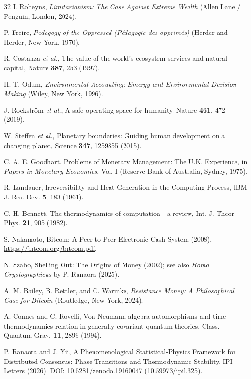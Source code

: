 \documentclass[aps,pre,twocolumn,10pt,superscriptaddress,amsmath,amssymb,amsfonts,floatfix,showkeys]{revtex4-2}
\begin{document}
\begin{thebibliography}{32}
I. Robeyns, \textit{Limitarianism: The Case Against Extreme Wealth} (Allen Lane / Penguin, London, 2024).

P. Freire, \textit{Pedagogy of the Oppressed (P\'edagogie des opprim\'es)} (Herder and Herder, New York, 1970).

R. Costanza \textit{et al.}, The value of the world's ecosystem services and natural capital, Nature \textbf{387}, 253 (1997).

H. T. Odum, \textit{Environmental Accounting: Emergy and Environmental Decision Making} (Wiley, New York, 1996).

J. Rockstr\"om \textit{et al.}, A safe operating space for humanity, Nature \textbf{461}, 472 (2009).

W. Steffen \textit{et al.}, Planetary boundaries: Guiding human development on a changing planet, Science \textbf{347}, 1259855 (2015).

C. A. E. Goodhart, Problems of Monetary Management: The U.K. Experience, in \textit{Papers in Monetary Economics}, Vol. I (Reserve Bank of Australia, Sydney, 1975).

R. Landauer, Irreversibility and Heat Generation in the Computing Process, IBM J. Res. Dev. \textbf{5}, 183 (1961).

C. H. Bennett, The thermodynamics of computation---a review, Int. J. Theor. Phys. \textbf{21}, 905 (1982).

S. Nakamoto, Bitcoin: A Peer-to-Peer Electronic Cash System (2008), \url{https://bitcoin.org/bitcoin.pdf}.

N. Szabo, Shelling Out: The Origins of Money (2002); see also \textit{Homo Cryptographicus} by P. Ranaora (2025).

A. M. Bailey, B. Rettler, and C. Warmke, \textit{Resistance Money: A Philosophical Case for Bitcoin} (Routledge, New York, 2024).

A. Connes and C. Rovelli, Von Neumann algebra automorphisms and time-thermodynamics relation in generally covariant quantum theories, Class. Quantum Grav. \textbf{11}, 2899 (1994).

P. Ranaora and J. Yii, A Phenomenological Statistical-Physics Framework for Distributed Consensus: Phase Transitions and Thermodynamic Stability, IPI Letters (2026), \href{https://doi.org/10.5281/zenodo.19160047}{DOI: 10.5281/zenodo.19160047} (\href{https://doi.org/10.59973/ipil.325}{10.59973/ipil.325}).


\end{thebibliography}
\end{document}
